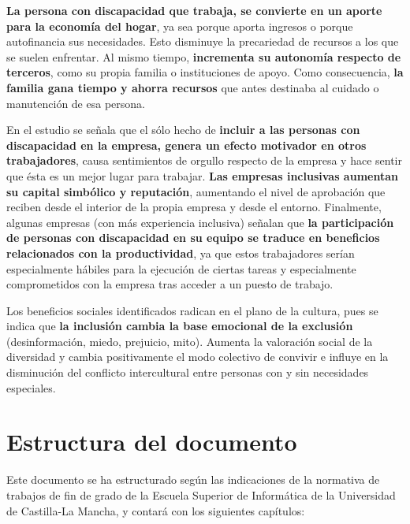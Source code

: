 \textbf{La persona con discapacidad que trabaja, se convierte en un aporte para la economía del hogar}, ya sea porque aporta ingresos o porque autofinancia sus necesidades. Esto disminuye la precariedad de recursos a los que se suelen enfrentar. Al mismo tiempo, \textbf{incrementa su autonomía respecto de terceros}, como su propia familia o instituciones de apoyo. Como consecuencia, \textbf{la familia gana tiempo y ahorra recursos} que antes destinaba al cuidado o manutención de esa persona. 

En el estudio se señala que el sólo hecho de \textbf{incluir a las personas con discapacidad en la empresa, genera un efecto motivador en otros trabajadores}, causa sentimientos de orgullo respecto de la empresa y hace sentir que ésta es un mejor lugar para trabajar. \textbf{Las empresas inclusivas aumentan su capital simbólico y reputación}, aumentando el nivel de aprobación que reciben desde el interior de la propia empresa y desde el entorno. Finalmente, algunas empresas (con más experiencia inclusiva) señalan que \textbf{la participación de personas con discapacidad en su equipo se traduce en beneficios relacionados con la productividad}, ya que estos trabajadores serían especialmente hábiles para la ejecución de ciertas tareas y especialmente comprometidos con la empresa tras acceder a un puesto de trabajo. 

Los beneficios sociales identificados radican en el plano de la cultura, pues se indica que \textbf{la inclusión cambia la base emocional de la exclusión} (desinformación, miedo, prejuicio, mito). Aumenta la valoración social de la diversidad y cambia positivamente el modo colectivo de convivir e influye en la disminución del conflicto intercultural entre personas con y sin necesidades especiales.
 
\section{Estructura del documento}

  Este documento se ha estructurado según las indicaciones de la normativa de trabajos de fin de grado de la Escuela Superior de Informática de la Universidad de Castilla-La Mancha, y contará con los siguientes capítulos:



